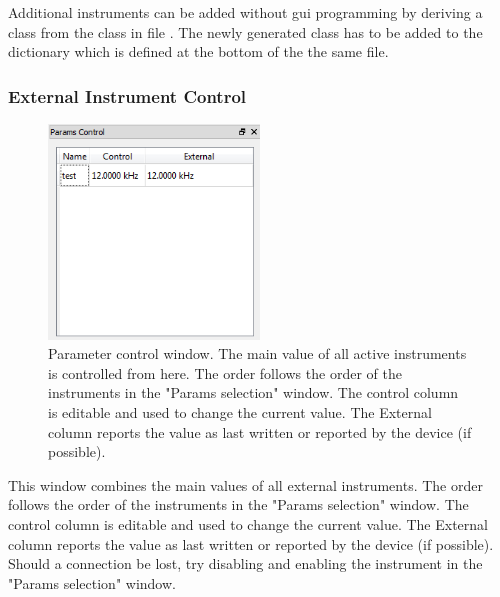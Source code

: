 \documentclass[11pt]{scrartcl}
\begin{document}
Additional instruments can be added without gui programming by deriving a class from the class  in file . The newly generated class has to be added to the  dictionary which is defined at the bottom of the the same file.

\subsubsection{External Instrument Control}

\begin{figure}
\centering
\includegraphics[width=0.5\textwidth]{ParamsControl}
\caption{\label{GlobalVariables} Parameter control window. The main value of all active instruments is controlled from here. The order follows the order of the instruments in the "Params selection" window. The control column is editable and used to change the current value. The External column reports the value as last written or reported by the device (if possible).}
\end{figure}
This window combines the main values of all external instruments. The order follows the order of the instruments in the "Params selection" window. The control column is editable and used to change the current value. The External column reports the value as last written or reported by the device (if possible). Should a connection be lost, try disabling and enabling the instrument in the "Params selection" window.
\end{document}
